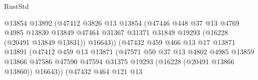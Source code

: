 \begin{lexlean}{RustStd}
\begin{coremodule}
                                        @13854
                                        @13892
                                        (@47412
                                          @3826
                                          @13
                                          @13854
                                          (@47446
                                            @448
                                            @37
                                            @13
                                            @4769
                                            @4985
                                            @13830
                                            @13849
                                            @47464
                                            @31367
                                            @31371
                                            @31849
                                            @19293
                                            (@16228 (@20491 @13849 @13831))
                                            @16643))
                                        (@47432
                                          @459
                                          @466
                                          @13
                                          @17
                                          @13871
                                          @13891
                                          (@47412
                                            @459
                                            @13
                                            @13871
                                            (@47571
                                              @50
                                              @37
                                              @13
                                              @4802
                                              @4985
                                              @13859
                                              @13866
                                              @47586
                                              @47590
                                              @47594
                                              @31375
                                              @19293
                                              (@16228 (@20491 @13866 @13860))
                                              @16643))
                                          (@47432
                                            @464
                                            @121
                                            @13

\end{coremodule}
\end{lexlean}
